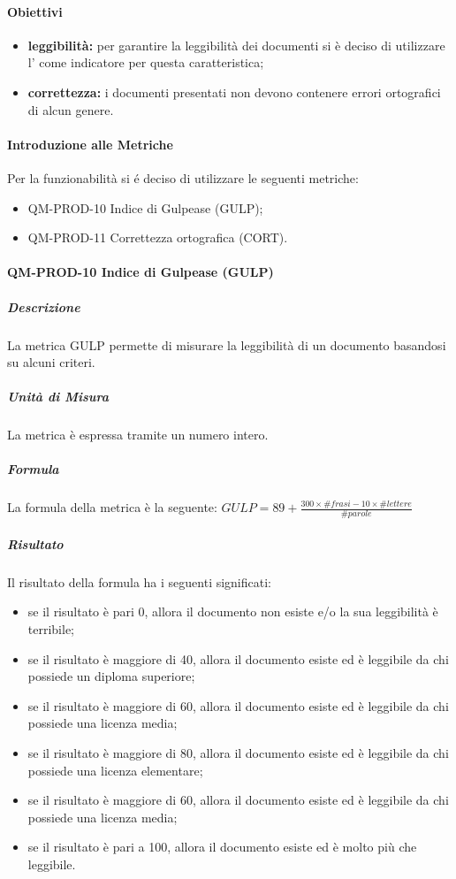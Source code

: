 				\paragraph{Obiettivi}
					\begin{itemize}
						\item \textbf{leggibilità:} per garantire la leggibilità dei documenti si è deciso di utilizzare l' come indicatore per questa caratteristica;
						\item \textbf{correttezza:} i documenti presentati non devono contenere errori ortografici di alcun genere.
					\end{itemize}
			\paragraph{Introduzione alle Metriche}
				Per la funzionabilità si é deciso di utilizzare le seguenti metriche:
				\begin{itemize}
					\item QM-PROD-10 Indice di Gulpease (GULP);
					\item QM-PROD-11 Correttezza ortografica (CORT).
				\end{itemize}
			\paragraph{QM-PROD-10 Indice di Gulpease (GULP)}
				\subparagraph{Descrizione}
					La metrica GULP permette di misurare la leggibilità di un documento basandosi su alcuni criteri.
				\subparagraph{Unità di Misura}
					La metrica è espressa tramite un numero intero.
				\subparagraph{Formula}
					La formula della metrica è la seguente:
					\(
						GULP = 89+\frac{300\times\# frasi-10\times\#lettere}{\#parole}
					\)
				\subparagraph{Risultato}
					Il risultato della formula ha i seguenti significati:
					\begin{itemize}
						\item se il risultato è pari 0, allora il documento non esiste e/o la sua leggibilità è terribile;
						\item se il risultato è maggiore di 40, allora il documento esiste ed è leggibile da chi possiede un diploma superiore;
						\item se il risultato è maggiore di 60, allora il documento esiste ed è leggibile da chi possiede una licenza media;
						\item se il risultato è maggiore di 80, allora il documento esiste ed è leggibile da chi possiede una licenza elementare;
						\item se il risultato è maggiore di 60, allora il documento esiste ed è leggibile da chi possiede una licenza media;
						\item se il risultato è pari a 100, allora il documento esiste ed è molto più che leggibile.
					\end{itemize}
